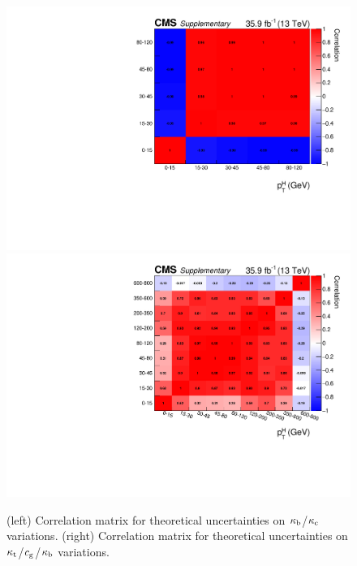 \begin{figure}[hbtp]
  \begin{center}
    \includegraphics[width=\halflinewidth]{img/interpretation/other/corrmat_yukawa.pdf}
    \includegraphics[width=\halflinewidth]{img/interpretation/other/corrmat_tophighpt.pdf}
    \caption{
        (left) Correlation matrix for theoretical uncertainties on $\kappa_{\mathrm{b}}$/$\kappa_{\mathrm{c}}$ variations.
        (right) Correlation matrix for theoretical uncertainties on $\kappa_{\mathrm{t}}$/$c_\mathrm{g}$/$\kappa_{\mathrm{b}}$ variations.
        }
    \label{fig:scalecorrelationmatrices}
  \end{center}
\end{figure}




